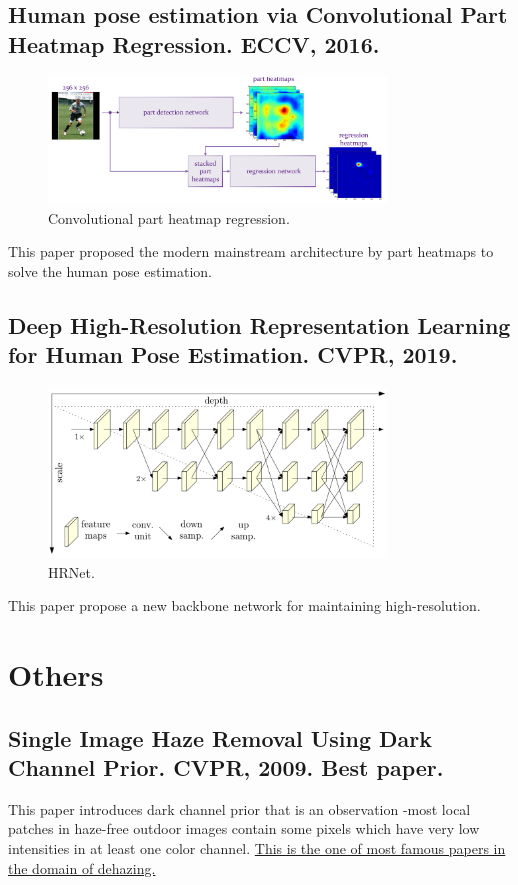 \documentclass[10pt,onecolumn]{book}
\begin{document}
\section{Human pose estimation via Convolutional Part Heatmap Regression. ECCV, 2016.}
\begin{figure}[h]
\centering
\includegraphics[width=0.8\textwidth]{figures_paper_reading/2016_ECCV_Human_pose_estimation_via_Convolutional_Part_Heatmap_Regression.png}
\caption{Convolutional part heatmap regression.}
\label{fig}
\end{figure}
This paper proposed the modern mainstream architecture by part heatmaps to solve the human pose estimation.

\section{Deep High-Resolution Representation Learning for Human Pose Estimation. CVPR, 2019.}
\begin{figure}[h]
\centering
\includegraphics[width=0.8\textwidth]{figures_paper_reading/HRNet.png}
\caption{HRNet.}
\label{fig}
\end{figure}
This paper propose a new backbone network for maintaining high-resolution.

\chapter{Others}
\section{Single Image Haze Removal Using Dark Channel Prior. CVPR, 2009. Best paper.}
This paper introduces dark channel prior that is an observation -most local patches in haze-free outdoor images contain some pixels which have very low intensities in at least one color channel. \uline{This is the one of most famous papers in the domain of dehazing.}
\end{document}

